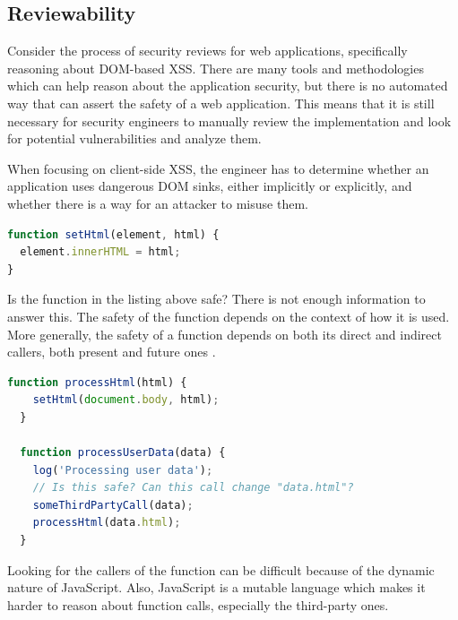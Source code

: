 \subsection{Reviewability}

Consider the process of security reviews for web applications, specifically reasoning about
DOM-based XSS. There are many tools and methodologies which can help reason about the application
security, but there is no automated way that can assert the safety of a web application. This means
that it is still necessary for security engineers to manually review the implementation and look for
potential vulnerabilities and analyze them.

When focusing on client-side XSS, the engineer has to determine whether an application uses
dangerous DOM sinks, either implicitly or explicitly, and whether there is a way for an attacker to
misuse them.

\vspace{5mm}
\bigskip
\begin{lstlisting}[language=JavaScript, caption=Possibly dangerous function]
function setHtml(element, html) {
  element.innerHTML = html;
}
\end{lstlisting}

Is the function in the listing above safe? There is not enough information to answer this. The
safety of the function depends on the context of how it is used. More generally, the safety of a
function depends on both its direct and indirect callers, both present and future ones
\cite{tt_design_history}.

\vspace{5mm}
\bigskip
\begin{lstlisting}[language=JavaScript, caption=Usage of the possibly dangerous function, label={lst:dangerous_fn_usage}]
  function processHtml(html) {
    setHtml(document.body, html);
  }

  function processUserData(data) {
    log('Processing user data');
    // Is this safe? Can this call change "data.html"?
    someThirdPartyCall(data);
    processHtml(data.html);
  }
\end{lstlisting}

Looking for the callers of the function can be difficult because of the dynamic nature of
JavaScript. Also, JavaScript is a mutable language which makes it harder to reason about function
calls, especially the third-party ones.

